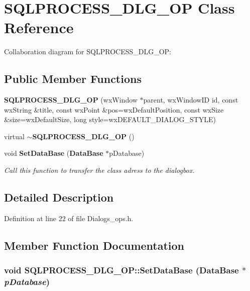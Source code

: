\section{SQLPROCESS\_\-DLG\_\-OP Class Reference}
\label{class_s_q_l_p_r_o_c_e_s_s___d_l_g___o_p}
Collaboration diagram for SQLPROCESS\_\-DLG\_\-OP:\subsection*{Public Member Functions}
\begin{CompactItemize}
\item 
{\bf SQLPROCESS\_\-DLG\_\-OP} (wx\-Window $\ast$parent, wx\-Window\-ID id, const wx\-String \&title, const wx\-Point \&pos=wx\-Default\-Position, const wx\-Size \&size=wx\-Default\-Size, long style=wx\-DEFAULT\_\-DIALOG\_\-STYLE)\label{class_s_q_l_p_r_o_c_e_s_s___d_l_g___o_p_d81023792ac198b32407e0b201bc4fae}

\item 
virtual {\bf $\sim$SQLPROCESS\_\-DLG\_\-OP} ()\label{class_s_q_l_p_r_o_c_e_s_s___d_l_g___o_p_2c434dbfaf42defdab28cab40870c777}

\item 
void {\bf Set\-Data\-Base} ({\bf Data\-Base} $\ast$p\-Database)
\begin{CompactList}\small\item\em Call this function to transfer the class adress to the dialogbox. \item\end{CompactList}\end{CompactItemize}


\subsection{Detailed Description}




Definition at line 22 of file Dialogs\_\-ops.h.

\subsection{Member Function Documentation}
\subsubsection{\setlength{\rightskip}{0pt plus 5cm}void SQLPROCESS\_\-DLG\_\-OP::Set\-Data\-Base ({\bf Data\-Base} $\ast$ {\em p\-Database})}\label{class_s_q_l_p_r_o_c_e_s_s___d_l_g___o_p_ea703751cf381132439fdabc79c41f23}


